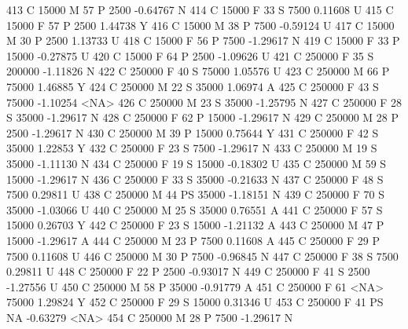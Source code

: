 \documentclass{article}
\begin{document}
\begin{Schunk}
\begin{Soutput}
413       C      15000   M  57         P   2500  -0.64767    N
414       C      15000   F  33         S   7500   0.11608    U
415       C      15000   F  57         P   2500   1.44738    Y
416       C      15000   M  38         P   7500  -0.59124    U
417       C      15000   M  30         P   2500   1.13733    U
418       C      15000   F  56         P   7500  -1.29617    N
419       C      15000   F  33         P  15000  -0.27875    U
420       C      15000   F  64         P   2500  -1.09626    U
421       C     250000   F  35         S 200000  -1.11826    N
422       C     250000   F  40         S  75000   1.05576    U
423       C     250000   M  66         P  75000   1.46885    Y
424       C     250000   M  22         S  35000   1.06974    A
425       C     250000   F  43         S  75000  -1.10254 <NA>
426       C     250000   M  23         S  35000  -1.25795    N
427       C     250000   F  28         S  35000  -1.29617    N
428       C     250000   F  62         P  15000  -1.29617    N
429       C     250000   M  28         P   2500  -1.29617    N
430       C     250000   M  39         P  15000   0.75644    Y
431       C     250000   F  42         S  35000   1.22853    Y
432       C     250000   F  23         S   7500  -1.29617    N
433       C     250000   M  19         S  35000  -1.11130    N
434       C     250000   F  19         S  15000  -0.18302    U
435       C     250000   M  59         S  15000  -1.29617    N
436       C     250000   F  33         S  35000  -0.21633    N
437       C     250000   F  48         S   7500   0.29811    U
438       C     250000   M  44        PS  35000  -1.18151    N
439       C     250000   F  70         S  35000  -1.03066    U
440       C     250000   M  25         S  35000   0.76551    A
441       C     250000   F  57         S  15000   0.26703    Y
442       C     250000   F  23         S  15000  -1.21132    A
443       C     250000   M  47         P  15000  -1.29617    A
444       C     250000   M  23         P   7500   0.11608    A
445       C     250000   F  29         P   7500   0.11608    U
446       C     250000   M  30         P   7500  -0.96845    N
447       C     250000   F  38         S   7500   0.29811    U
448       C     250000   F  22         P   2500  -0.93017    N
449       C     250000   F  41         S   2500  -1.27556    U
450       C     250000   M  58         P  35000  -0.91779    A
451       C     250000   F  61      <NA>  75000   1.29824    Y
452       C     250000   F  29         S  15000   0.31346    U
453       C     250000   F  41        PS     NA  -0.63279 <NA>
454       C     250000   M  28         P   7500  -1.29617    N

\end{Soutput}
\end{Schunk}
\end{document}
